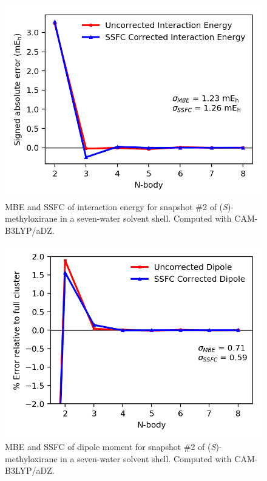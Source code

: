     \begin{figure}
        \centering
        \includegraphics[scale=0.75]{p1/graphs/si/metox2_7_int.png}
        \caption{MBE and SSFC of interaction energy for snapshot \#2 of (\textit{S})-methyloxirane in a seven-water solvent shell. Computed with CAM-B3LYP/aDZ.}
        \label{metox2_7_int}
    \end{figure}
    \begin{figure}
        \centering
        \includegraphics[scale=0.75]{p1/graphs/si/metox2_7_dip.png}
        \caption{MBE and SSFC of dipole moment for snapshot \#2 of (\textit{S})-methyloxirane in a seven-water solvent shell. Computed with CAM-B3LYP/aDZ.}
        \label{metox2_7_dip}
      \end{figure}
